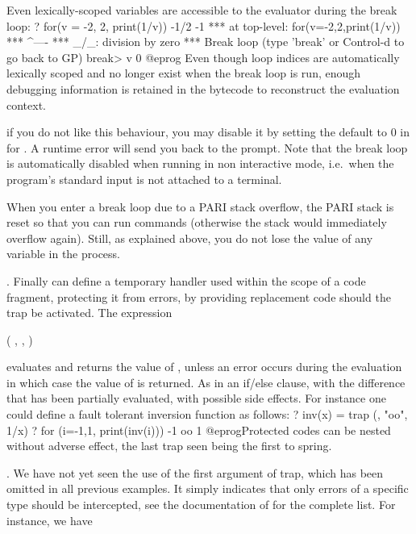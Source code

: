 Even lexically-scoped variables are accessible to the evaluator during the
break loop:
\bprog
? for(v = -2, 2, print(1/v))
-1/2
-1
  ***   at top-level: for(v=-2,2,print(1/v))
  ***                                   ^----
  *** _/_: division by zero
  ***   Break loop (type 'break' or Control-d to go back to GP)
break> v
0
@eprog\noindent
Even though loop indices are automatically lexically scoped and no longer
exist when the break loop is run, enough debugging information is retained in
the bytecode to reconstruct the evaluation context.

 if you do not like this behaviour, you may disable it by
setting the default  to 0 in for . A runtime error
will send you back to the prompt. Note that the break loop is automatically
disabled when running  in non interactive mode, i.e.~when the
program's standard input is not attached to a terminal.

 When you enter a break loop due to a PARI stack
overflow, the PARI stack is reset so that you can run commands (otherwise the
stack would immediately overflow again). Still, as explained above, you do
not lose the value of any  variable in the process.

. Finally  can define a temporary handler
used within the scope of a code fragment, protecting it from errors, by
providing replacement code should the trap be activated. The expression

  ( , , )

\noindent evaluates and returns the value of , unless an
error occurs during the evaluation in which case the value of 
is returned. As in an if/else clause, with the difference that
 has been partially evaluated, with possible side effects.
For instance one could define a fault tolerant inversion function as follows:
\bprog
? inv(x) = trap (, "oo", 1/x)
? for (i=-1,1, print(inv(i)))
-1
oo
1
@eprog\noindent Protected codes can be nested without adverse effect, the
last trap seen being the first to spring.

. We have not yet seen the use of the
first argument of trap, which has been omitted in all previous examples. It
simply indicates that only errors of a specific type should be intercepted,
see the documentation of  for the complete list. For instance, we
have

